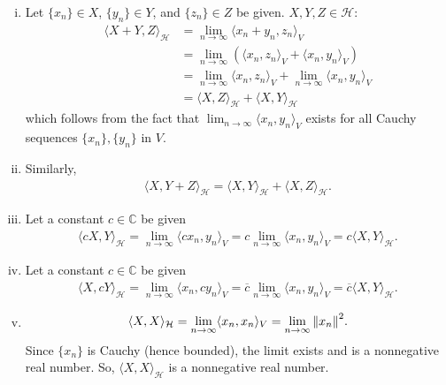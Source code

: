 \documentclass[11pt]{article}
\begin{document}
\begin{enumerate}[(a)]
\begin{itemize}
\begin{enumerate}[(i)]
			\item Let $\{x_n\} \in X$, $\{y_n\} \in Y$, and $\{z_n\} \in Z$ be given. $X,Y,Z\in \mathcal{H}$:
			\begin{align*}
			\langle X+Y,Z \rangle_\mathcal{H} &= \lim_{n\to\infty}\langle x_n+y_n,z_n \rangle_V \\
			&= \lim_{n\to\infty}\left(\langle x_n,z_n \rangle_V + \langle x_n,y_n\rangle_V\right) \\
			&= \lim_{n\to\infty}\langle x_n,z_n \rangle_V + \lim_{n\to\infty}\langle x_n,y_n\rangle_V\\
			&= \langle X,Z \rangle_\mathcal{H} + \langle X,Y\rangle_\mathcal{H} 
			\end{align*}
			which follows from the fact that $\lim_{n\to\infty}\langle x_n,y_n \rangle_V$ exists for all Cauchy sequences $\{x_n\}, \{y_n\}$ in $V$.
			
			\item Similarly,
			\begin{align*}
			\langle X,Y+Z\rangle_\mathcal{H} = \langle X,Y\rangle_\mathcal{H} + \langle X,Z\rangle_\mathcal{H}.
			\end{align*}
			
			\item Let a constant $c\in \mathbb{C}$ be given
			\begin{align*}
			\langle cX,Y\rangle_\mathcal{H} = \lim_{n\to\infty}\langle cx_n,y_n\rangle_V = c \lim_{n\to\infty}\langle x_n,y_n\rangle_V = c\langle X,Y\rangle_\mathcal{H}.
			\end{align*}

			
			
			\item Let a constant $c\in \mathbb{C}$ be given
			\begin{align*}
			\langle X,cY\rangle_\mathcal{H} = \lim_{n\to\infty}\langle x_n,cy_n\rangle_V = \overline{c} \lim_{n\to\infty}\langle x_n,y_n\rangle_V = \overline{c}\langle X,Y\rangle_\mathcal{H}.
			\end{align*}
			
			
			\item 
			\begin{align*}
			\langle X,X\rangle_\mathcal{H} = \lim_{n\to \infty}\langle x_n,x_n\rangle_V = \lim_{n\to\infty}\norm{x_n}^2.
			\end{align*}
			Since $\{x_n\}$ is Cauchy (hence bounded), the limit exists and is a nonnegative real number. So, $\langle X,X\rangle_\mathcal{H}$ is a nonnegative real number. 
			

\end{enumerate}
\end{itemize}
\end{enumerate}
\end{document}
